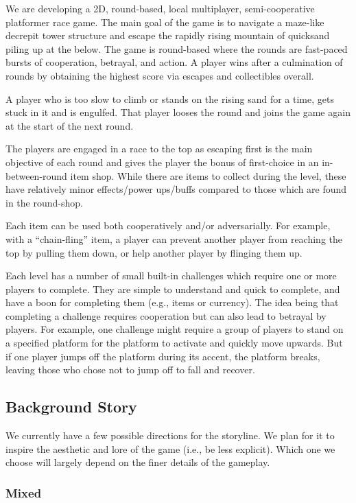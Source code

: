 We are developing a 2D, round-based, local multiplayer, semi-cooperative platformer race game. The main goal of the game is to navigate a maze-like decrepit tower structure and escape the rapidly rising mountain of quicksand piling up at the below. The game is round-based where the rounds are fast-paced bursts of cooperation, betrayal, and action. A player wins after a culmination of rounds by obtaining the highest score via escapes and collectibles overall.

A player who is too slow to climb or stands on the rising sand for a time, gets stuck in it and is engulfed. That player looses the round and joins the game again at the start of the next round.

The players are engaged in a race to the top as escaping first is the main objective of each round and gives the player the bonus of first-choice in an in-between-round item shop. While there are items to collect during the level, these have relatively minor effects/power ups/buffs compared to those which are found in the round-shop.

Each item can be used both cooperatively and/or adversarially. For example, with a ``chain-fling'' item, a player can prevent another player from reaching the top by pulling them down, or help another player by flinging them up.

Each level has a number of small built-in challenges which require one or more players to complete. They are simple to understand and quick to complete, and have a boon for completing them (e.g., items or currency). The idea being that completing a challenge requires cooperation but can also lead to betrayal by players. For example, one challenge might require a group of players to stand on a specified platform for the platform to activate and quickly move upwards. But if one player jumps off the platform during its accent, the platform breaks, leaving those who chose not to jump off to fall and recover.

\subsection{Background Story}

We currently have a few possible directions for the storyline. We plan for it to inspire the aesthetic and lore of the game (i.e., be less explicit). Which one we choose will largely depend on the finer details of the gameplay.

\subsubsection{Mixed}

